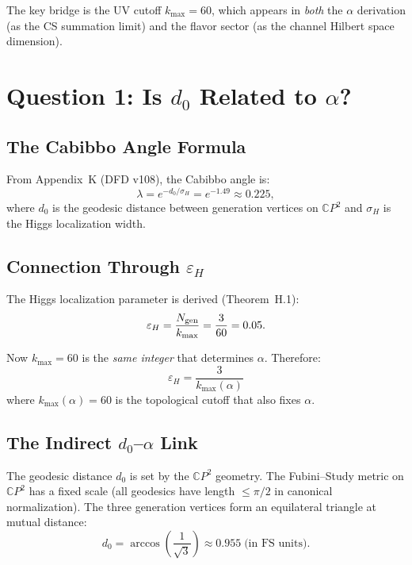 \documentclass[11pt]{article}
\newcommand{\CP}{\mathbb{C}P}
\theoremstyle{remark}
\begin{document}
The key bridge is the UV cutoff $k_{\max} = 60$, which appears in
\emph{both} the $\alpha$ derivation (as the CS summation limit) and
the flavor sector (as the channel Hilbert space dimension).

\section{Question 1: Is $d_0$ Related to $\alpha$?}
\label{sec:d0}

\subsection{The Cabibbo Angle Formula}

From Appendix~K (DFD v108), the Cabibbo angle is:
\begin{equation}\label{eq:cabibbo}
\lambda = e^{-d_0/\sigma_H} = e^{-1.49} \approx 0.225,
\end{equation}
where $d_0$ is the geodesic distance between generation vertices on $\CP^2$
and $\sigma_H$ is the Higgs localization width.

\subsection{Connection Through $\varepsilon_H$}

The Higgs localization parameter is derived (Theorem~H.1):
\begin{equation}
\varepsilon_H = \frac{N_{\rm gen}}{k_{\max}} = \frac{3}{60} = 0.05.
\end{equation}

Now $k_{\max} = 60$ is the \emph{same integer} that determines $\alpha$.
Therefore:
\begin{equation}\label{eq:eps_alpha}
\boxed{\varepsilon_H = \frac{3}{k_{\max}(\alpha)}}
\end{equation}
where $k_{\max}(\alpha) = 60$ is the topological cutoff that also fixes $\alpha$.

\subsection{The Indirect $d_0$--$\alpha$ Link}

The geodesic distance $d_0$ is set by the $\CP^2$ geometry.
The Fubini--Study metric on $\CP^2$ has a fixed scale (all geodesics
have length $\leq \pi/2$ in canonical normalization). The three
generation vertices form an equilateral triangle at mutual distance:
\begin{equation}
d_0 = \arccos\!\left(\frac{1}{\sqrt{3}}\right) \approx 0.955 \;\text{(in FS units)}.
\end{equation}
\end{document}

